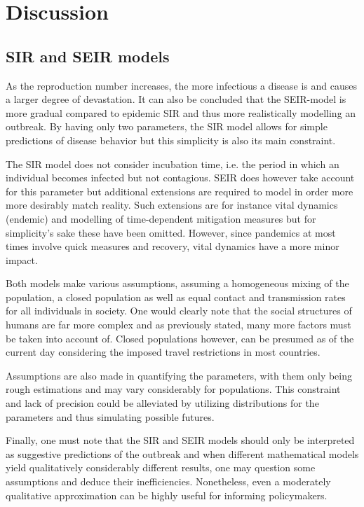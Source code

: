 \documentclass[12pt]{article}
\begin{document}
\section{Discussion}
\subsection{SIR and SEIR models}
As the reproduction number increases, the more infectious a disease is and causes a larger degree of devastation. It can also be concluded that the SEIR-model is more gradual compared to epidemic SIR and thus more realistically modelling an outbreak. By having only two parameters, the SIR model allows for simple predictions of disease behavior but this simplicity is also its main constraint. 

The SIR model does not consider incubation time, i.e. the period in which an individual becomes infected but not contagious. SEIR does however take account for this parameter but additional extensions are required to model in order more more desirably match reality. Such extensions are for instance vital dynamics (endemic) and modelling of time-dependent mitigation measures but for simplicity's sake these have been omitted. However, since pandemics at most times involve quick measures and recovery, vital dynamics have a more minor impact. 

Both models make various assumptions, assuming a homogeneous mixing of the population, a closed population as well as equal contact and transmission rates for all individuals in society. One would clearly note that the social structures of humans are far more complex and as previously stated, many more factors must be taken into account of. Closed populations however, can be presumed as of the current day considering the imposed travel restrictions in most countries. 

Assumptions are also made in quantifying the parameters, with them only being rough estimations and may vary considerably for populations. This constraint and lack of precision could be alleviated by utilizing distributions for the parameters and thus simulating possible futures.

Finally, one must note that the SIR and SEIR models should only be interpreted as suggestive predictions of the outbreak and when different mathematical models yield qualitatively considerably different results, one may question some assumptions and deduce their inefficiencies. Nonetheless, even a moderately qualitative approximation can be highly useful for informing policymakers.
\end{document}
